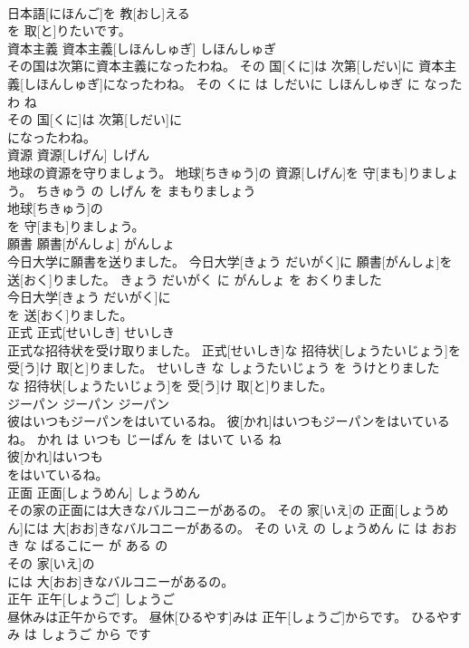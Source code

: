\documentclass[8pt]{extreport}
\begin{document}
\begin{CJK}{UTF8}{min}
\\	日本語[にほんご]を 教[おし]える
\\	を 取[と]りたいです。			
\\	資本主義	資本主義[しほんしゅぎ]	しほんしゅぎ	
\\	その国は次第に資本主義になったわね。	その 国[くに]は 次第[しだい]に 資本主義[しほんしゅぎ]になったわね。	その くに は しだいに しほんしゅぎ に なった わ ね	
\\	その 国[くに]は 次第[しだい]に
\\	になったわね。			
\\	資源	資源[しげん]	しげん	
\\	地球の資源を守りましょう。	地球[ちきゅう]の 資源[しげん]を 守[まも]りましょう。	ちきゅう の しげん を まもりましょう	
\\	地球[ちきゅう]の
\\	を 守[まも]りましょう。			
\\	願書	願書[がんしょ]	がんしょ	
\\	今日大学に願書を送りました。	今日大学[きょう だいがく]に 願書[がんしょ]を 送[おく]りました。	きょう だいがく に がんしょ を おくりました	
\\	今日大学[きょう だいがく]に
\\	を 送[おく]りました。			
\\	正式	正式[せいしき]	せいしき	
\\	正式な招待状を受け取りました。	正式[せいしき]な 招待状[しょうたいじょう]を 受[う]け 取[と]りました。	せいしき な しょうたいじょう を うけとりました	
\\	な 招待状[しょうたいじょう]を 受[う]け 取[と]りました。			
\\	ジーパン	ジーパン	ジーパン	
\\	彼はいつもジーパンをはいているね。	彼[かれ]はいつもジーパンをはいているね。	かれ は いつも じーぱん を はいて いる ね	
\\	彼[かれ]はいつも
\\	をはいているね。			
\\	正面	正面[しょうめん]	しょうめん	
\\	その家の正面には大きなバルコニーがあるの。	その 家[いえ]の 正面[しょうめん]には 大[おお]きなバルコニーがあるの。	その いえ の しょうめん に は おおき な ばるこにー が ある の	
\\	その 家[いえ]の
\\	には 大[おお]きなバルコニーがあるの。			
\\	正午	正午[しょうご]	しょうご	
\\	昼休みは正午からです。	昼休[ひるやす]みは 正午[しょうご]からです。	ひるやすみ は しょうご から です	

\end{CJK}
\end{document}
